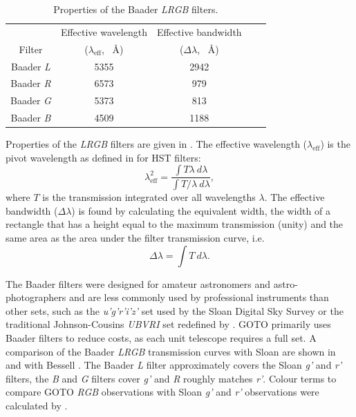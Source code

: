 \begin{colsection}
\begin{colsection}
\begin{table}[t]
    \begin{center}
        \begin{tabular}{c|cccc} %
             & Effective wavelength & Effective bandwidth\\
            Filter & ($\lambda_\text{eff}$, \SI{}{\angstrom}) & ($\Delta\lambda$, \SI{}{\angstrom}) \\
            \midrule
            Baader \textit{L} & 5355 & 2942 \\
            Baader \textit{R} & 6573 &  979 \\
            Baader \textit{G} & 5373 &  813 \\
            Baader \textit{B} & 4509 & 1188 \\
        \end{tabular}
    \end{center}
    \caption[Baader filter properties]{
        Properties of the Baader \textit{LRGB} filters.
    }\label{tab:filters}
\end{table}

Properties of the \textit{LRGB} filters are given in . The effective wavelength ($\lambda_\text{eff}$) is the pivot wavelength as defined in \citet{HST_calibration} for HST filters:
%
\begin{equation}
    \lambda_\text{eff}^2 = \frac{\int T\lambda~d\lambda}{\int T/\lambda~d\lambda},
    \label{eq:pivot_wavelength}
\end{equation}
%
where $T$ is the transmission integrated over all wavelengths $\lambda$. The effective bandwidth ($\Delta\lambda$) is found by calculating the equivalent width, the width of a rectangle that has a height equal to the maximum transmission (unity) and the same area as the area under the filter transmission curve, i.e. 
%
\begin{equation}
    \Delta\lambda = \int T~d\lambda.
    \label{eq:bandwidth}
\end{equation}

The Baader filters were designed for amateur astronomers and astro-photographers and are less commonly used by professional instruments than other sets, such as the \textit{u'g'r'i'z'} set used by the Sloan Digital Sky Survey  \citep{Sloan_filters} or the traditional Johnson-Cousins \textit{UBVRI} set redefined by \citet{Bessell_filters}. GOTO primarily uses Baader filters to reduce costs, as each unit telescope requires a full set. A comparison of the Baader \textit{LRGB} transmission curves with Sloan are shown in  and with Bessell . The Baader \textit{L} filter approximately covers the Sloan \textit{g'} and \textit{r'} filters, the \textit{B} and \textit{G} filters cover \textit{g'} and \textit{R} roughly matches \textit{r'}. Colour terms to compare GOTO \textit{RGB} observations with Sloan \textit{g'} and \textit{r'} observations were calculated by \citet{Phaethon}.


\end{colsection}
\end{colsection}

